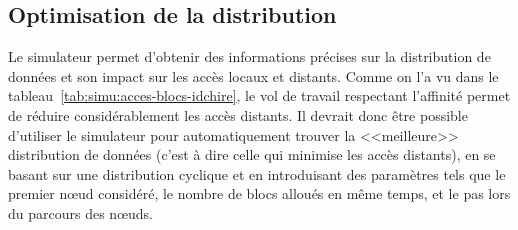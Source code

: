 \subsection{Optimisation de la distribution}

Le simulateur permet d'obtenir des informations précises sur la distribution de données et son impact sur les accès locaux et distants.
Comme on l'a vu dans le tableau~\ref{tab:simu:acces-blocs-idchire}, le vol de travail respectant l'affinité permet de réduire considérablement les accès distants.
Il devrait donc être possible d'utiliser le simulateur pour automatiquement trouver la <<meilleure>> distribution de données (c'est à dire celle qui minimise les accès distants), en se basant sur une distribution cyclique et en introduisant des paramètres tels que le premier nœud considéré, le nombre de blocs alloués en même temps, et le pas lors du parcours des nœuds.
